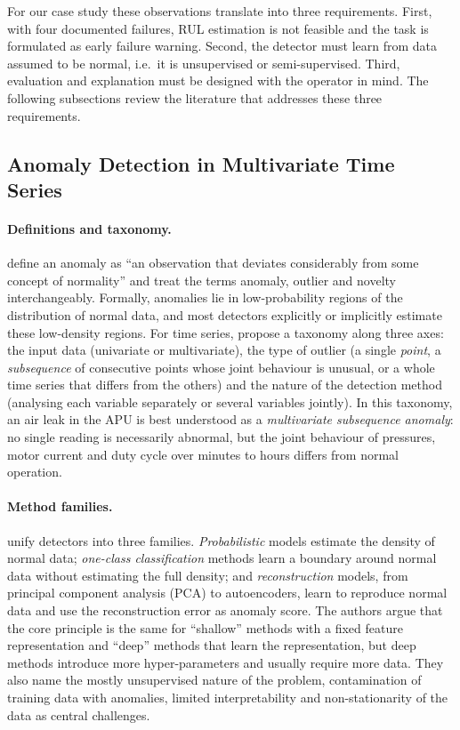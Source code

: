 For our case study these observations translate into three requirements. First, with four documented failures, RUL estimation is not feasible and the task is formulated as early failure warning. Second, the detector must learn from data assumed to be normal, i.e.\ it is unsupervised or semi-supervised. Third, evaluation and explanation must be designed with the operator in mind. The following subsections review the literature that addresses these three requirements.

\subsection{Anomaly Detection in Multivariate Time Series}
\label{sec:ad}

\paragraph{Definitions and taxonomy.}
\citet{ruff2021unifying} define an anomaly as ``an observation that deviates considerably from some concept of normality'' and treat the terms anomaly, outlier and novelty interchangeably. Formally, anomalies lie in low-probability regions of the distribution of normal data, and most detectors explicitly or implicitly estimate these low-density regions. For time series, \citet{blazquez2021review} propose a taxonomy along three axes: the input data (univariate or multivariate), the type of outlier (a single \emph{point}, a \emph{subsequence} of consecutive points whose joint behaviour is unusual, or a whole time series that differs from the others) and the nature of the detection method (analysing each variable separately or several variables jointly). In this taxonomy, an air leak in the APU is best understood as a \emph{multivariate subsequence anomaly}: no single reading is necessarily abnormal, but the joint behaviour of pressures, motor current and duty cycle over minutes to hours differs from normal operation.

\paragraph{Method families.}
\citet{ruff2021unifying} unify detectors into three families. \emph{Probabilistic} models estimate the density of normal data; \emph{one-class classification} methods learn a boundary around normal data without estimating the full density; and \emph{reconstruction} models, from principal component analysis (PCA) to autoencoders, learn to reproduce normal data and use the reconstruction error as anomaly score. The authors argue that the core principle is the same for ``shallow'' methods with a fixed feature representation and ``deep'' methods that learn the representation, but deep methods introduce more hyper-parameters and usually require more data. They also name the mostly unsupervised nature of the problem, contamination of training data with anomalies, limited interpretability and non-stationarity of the data as central challenges.

